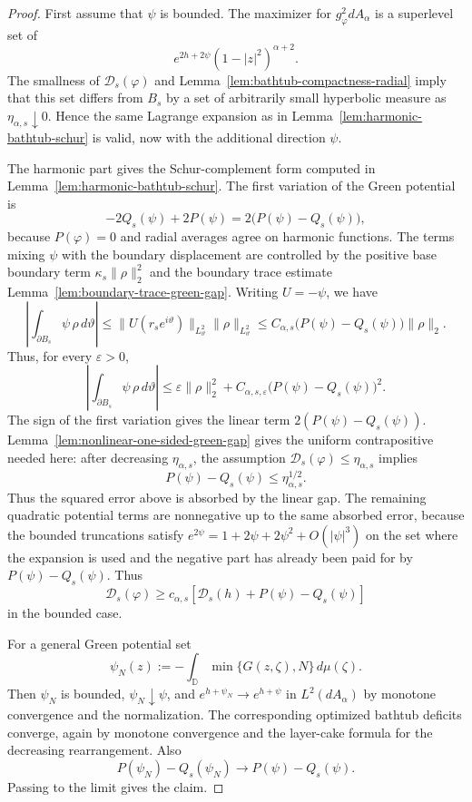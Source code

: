 \documentclass[a4paper,10pt]{amsart}
\newcommand{\D}{\mathbb{D}}
\begin{document}
\begin{proof}
First assume that $\psi$ is bounded. The maximizer for $g_\varphi^2dA_\alpha$
is a superlevel set of
\[
e^{2h+2\psi}(1-|z|^2)^{\alpha+2}.
\]
The smallness of $\mathcal D_s(\varphi)$ and
Lemma~\ref{lem:bathtub-compactness-radial} imply that this set differs from
$B_s$ by a set of arbitrarily small hyperbolic measure as
$\eta_{\alpha,s}\downarrow0$. Hence the same Lagrange expansion as in
Lemma~\ref{lem:harmonic-bathtub-schur} is valid, now with the additional
direction $\psi$.

The harmonic part gives the Schur-complement form computed in
Lemma~\ref{lem:harmonic-bathtub-schur}. The first variation of the Green
potential is
\[
-2Q_s(\psi)+2P(\psi)
=
2\bigl(P(\psi)-Q_s(\psi)\bigr),
\]
because $P(\varphi)=0$ and radial averages agree on harmonic functions. The
terms mixing $\psi$ with the boundary displacement are controlled by the
positive base boundary term $\kappa_s\|\rho\|_2^2$ and the boundary trace
estimate Lemma~\ref{lem:boundary-trace-green-gap}. Writing $U=-\psi$, we have
\[
\left|\int_{\partial B_s}\psi\,\rho\,d\vartheta\right|
\le
\|U(r_se^{i\vartheta})\|_{L^2_\vartheta}\|\rho\|_{L^2_\vartheta}
\le
C_{\alpha,s}\bigl(P(\psi)-Q_s(\psi)\bigr)\|\rho\|_2 .
\]
Thus, for every $\varepsilon>0$,
\[
\left|\int_{\partial B_s}\psi\,\rho\,d\vartheta\right|
\le
\varepsilon\|\rho\|_2^2
+C_{\alpha,s,\varepsilon}\bigl(P(\psi)-Q_s(\psi)\bigr)^2.
\]
The sign of the first variation gives the linear term
$2(P(\psi)-Q_s(\psi))$. Lemma~\ref{lem:nonlinear-one-sided-green-gap} gives the
uniform contrapositive needed here: after decreasing $\eta_{\alpha,s}$, the
assumption $\mathcal D_s(\varphi)\le\eta_{\alpha,s}$ implies
\[
P(\psi)-Q_s(\psi)\le\eta_{\alpha,s}^{1/2}.
\]
Thus the squared error above is absorbed by the linear gap. The remaining
quadratic potential terms are nonnegative up to the same absorbed error,
because the bounded truncations satisfy
$e^{2\psi}=1+2\psi+2\psi^2+O(|\psi|^3)$ on the set where the expansion is used
and the negative part has already been paid for by $P(\psi)-Q_s(\psi)$. Thus
\[
\mathcal D_s(\varphi)
\ge
c_{\alpha,s}
\left[
\mathcal D_s(h)+P(\psi)-Q_s(\psi)
\right]
\]
in the bounded case.

For a general Green potential set
\[
\psi_N(z):=-\int_\D \min\{G(z,\zeta),N\}\,d\mu(\zeta).
\]
Then $\psi_N$ is bounded, $\psi_N\downarrow\psi$, and
$e^{h+\psi_N}\to e^{h+\psi}$ in $L^2(dA_\alpha)$ by monotone convergence and
the normalization. The corresponding optimized bathtub deficits converge,
again by monotone convergence and the layer-cake formula for the decreasing
rearrangement. Also
\[
P(\psi_N)-Q_s(\psi_N)\to P(\psi)-Q_s(\psi).
\]
Passing to the limit gives the claim.
\end{proof}
\end{document}
